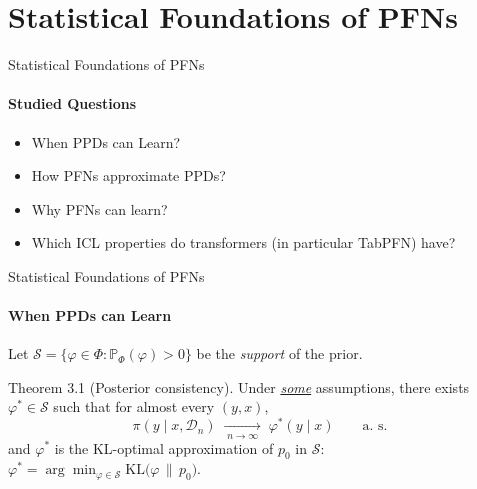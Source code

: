 \section{Statistical Foundations of PFNs}
\begin{frame}{Statistical Foundations of PFNs}
  \framesubtitle{Studied Questions}
  \begin{itemize}
    \item<alert@1> When PPDs can Learn?
    \item<alert@2> How PFNs approximate PPDs?
    \item<alert@3> Why PFNs can learn?
    \item<alert@4> Which ICL properties do transformers (in particular TabPFN) have?
  \end{itemize}
\end{frame}

\begin{frame}[label=ppdlearn]{Statistical Foundations of PFNs}
  \framesubtitle{When PPDs can Learn}
  \small
  \setlength{\abovedisplayskip}{4pt}\setlength{\belowdisplayskip}{4pt}
  \setlength{\abovedisplayshortskip}{2pt}\setlength{\belowdisplayshortskip}{2pt}

  Let $\mathcal{S} = \{\varphi \in \Phi : \mathbb{P}_\Phi(\varphi) > 0\}$ be the \emph{support} of the prior.

  \vspace{-0.2em}
  \begin{block}{Theorem 3.1 (Posterior consistency). \cite{naglerStatisticalFoundationsPriorData2023}}
    Under \hyperlink{ppdlearn<2>}{\textcolor{blue!55!black}{\emph{some}}} assumptions, there exists $\varphi^* \in \mathcal{S}$ such that for almost every $(y, x)$,
    \[
      \pi(y \mid x, \mathcal{D}_n) \;\xrightarrow[\;n \to \infty\;]{}\; \varphi^*(y \mid x) \qquad \text{a. s.}
    \]
    and $\varphi^*$ is the KL-optimal approximation of $p_0$ in $\mathcal{S}$:\quad
    $\displaystyle \varphi^* = \arg\min_{\varphi \in \mathcal{S}} \mathrm{KL}\big(\varphi \,\|\, p_0\big).$
  \end{block}

\end{frame}

